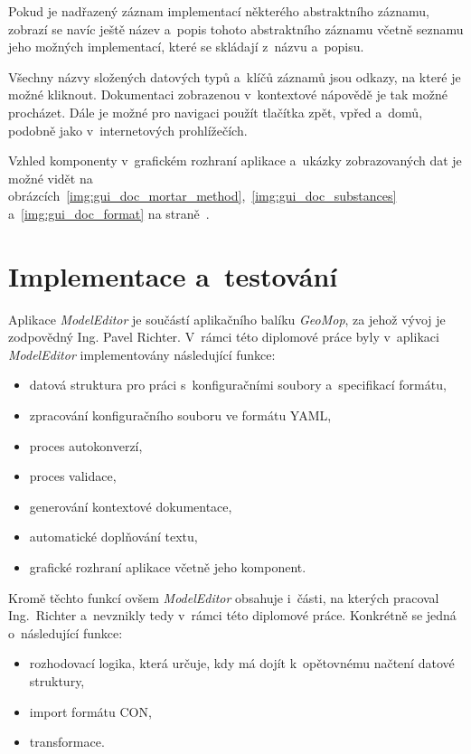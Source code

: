 \documentclass[FM,bw,DP]{tulthesis}
\begin{document}
Pokud je nadřazený záznam implementací některého abstraktního záznamu, zobrazí se navíc ještě název a~popis tohoto abstraktního záznamu včetně seznamu jeho možných implementací, které se skládají z~názvu a~popisu.

Všechny názvy složených datových typů a~klíčů záznamů jsou odkazy, na které je možné kliknout. Dokumentaci zobrazenou v~kontextové nápovědě je tak možné procházet. Dále je možné pro navigaci použít tlačítka zpět, vpřed a~domů, podobně jako v~internetových prohlížečích.

Vzhled komponenty v~grafickém rozhraní aplikace a~ukázky zobrazovaných dat je možné vidět na obrázcích~\ref{img:gui_doc_mortar_method},~\ref{img:gui_doc_substances} a~\ref{img:gui_doc_format} na straně~\pageref{img:gui_doc_mortar_method}.


\chapter{Implementace a~testování}

Aplikace \textit{ModelEditor} je součástí aplikačního balíku \textit{GeoMop}, za jehož vývoj je zodpovědný Ing. Pavel Richter. V~rámci této diplomové práce byly v~aplikaci \textit{Model\-Editor} implementovány následující funkce:

\begin{itemize}
\item datová struktura pro práci s~konfiguračními soubory a~specifikací formátu,
\item zpracování konfiguračního souboru ve formátu \gls{YAML},
\item proces autokonverzí,
\item proces validace,
\item generování kontextové dokumentace,
\item automatické doplňování textu,
\item grafické rozhraní aplikace včetně jeho komponent.
\end{itemize}

Kromě těchto funkcí ovšem \textit{ModelEditor} obsahuje i~části, na kterých pracoval Ing.~Richter a~nevznikly tedy v~rámci této diplomové práce. Konkrétně se jedná o~následující funkce:

\begin{itemize}
\item rozhodovací logika, která určuje, kdy má dojít k~opětovnému načtení datové struktury,
\item import formátu \gls{CON},
\item transformace.
\end{itemize}
\end{document}
